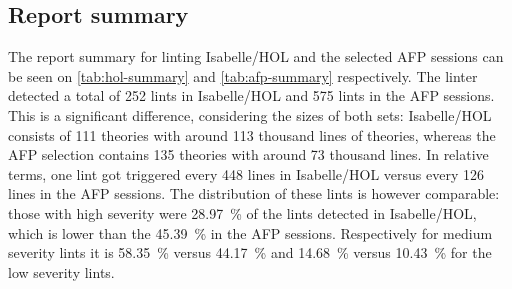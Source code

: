 \subsection{Report summary}
The report summary for linting Isabelle/HOL and the selected
AFP sessions can be seen on \autoref{tab:hol-summary} and
\autoref{tab:afp-summary} respectively. The linter detected a total
of 252 lints in Isabelle/HOL and 575 lints in the 
AFP sessions. This is a significant difference, considering
the sizes of both sets: Isabelle/HOL consists
of 111 theories with around 113 thousand lines of theories, whereas
the AFP selection contains 135 theories with around 73
thousand lines. In relative terms, one lint got triggered every
448 lines in Isabelle/HOL versus every 126 lines in
the AFP sessions. The distribution of these lints
is however comparable: those with high severity were \SI{28.97}{\percent} of the
lints detected in Isabelle/HOL, which is lower than the
\SI{45.39}{\percent} in the AFP sessions. Respectively for medium severity 
lints it is \SI{58.35}{\percent} versus \SI{44.17}{\percent} and \SI{14.68}{\percent} versus \SI{10.43}{\percent} for the low
severity lints.

